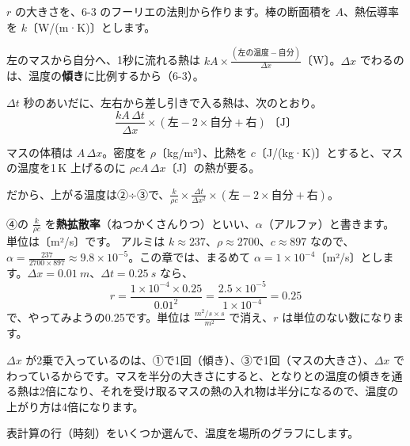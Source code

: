 $r$ の大きさを、6-3 のフーリエの法則から作ります。棒の断面積を $A$、熱伝導率を $k$〔W/(m·K)〕とします。
\begin{enumerate}[label={\bkcircled[\bkTT]{\arabic*}}, leftmargin=2.4\zw, itemsep=2pt, topsep=2pt]
\item 左のマスから自分へ、1秒に流れる熱は $kA\times\tfrac{(\text{左の温度}-\text{自分})}{\Delta x}$〔W〕。$\Delta x$ でわるのは、温度の\textbf{傾き}に比例するから（6-3）。
\item $\Delta t$ 秒のあいだに、左右から差し引きで入る熱は、次のとおり。
\[ \frac{kA\,\Delta t}{\Delta x}\times(\text{左}-2\times\text{自分}+\text{右})\ \text{〔J〕} \]
\item マスの体積は $A\,\Delta x$。密度を $\rho$〔kg/m³〕、比熱を $c$〔J/(kg·K)〕とすると、マスの温度を1\,K 上げるのに $\rho c A\,\Delta x$〔J〕の熱が要る。
\item だから、上がる温度は②÷③で、$\tfrac{k}{\rho c}\times\tfrac{\Delta t}{\Delta x^2}\times(\text{左}-2\times\text{自分}+\text{右})$。
\end{enumerate}
④の $\tfrac{k}{\rho c}$ を\textbf{熱拡散率}（ねつかくさんりつ）といい、$\alpha$（アルファ）と書きます。単位は〔m²/s〕です。
アルミは $k\approx237$、$\rho\approx2700$、$c\approx897$ なので、$\alpha=\tfrac{237}{2700\times897}\approx9.8\times10^{-5}$。この章では、まるめて $\alpha=1\times10^{-4}$〔m²/s〕とします。$\Delta x=\qty{0.01}{m}$、$\Delta t=\qty{0.25}{s}$ なら、
\[ r=\frac{1\times10^{-4}\times0.25}{0.01^2}=\frac{2.5\times10^{-5}}{1\times10^{-4}}=0.25 \]
で、やってみようの0.25です。単位は $\tfrac{\unit{m^2/s}\times\unit{s}}{\unit{m^2}}$ で消え、$r$ は単位のない数になります。

$\Delta x$ が2乗で入っているのは、①で1回（傾き）、③で1回（マスの大きさ）、$\Delta x$ でわっているからです。マスを半分の大きさにすると、となりとの温度の傾きを通る熱は2倍になり、それを受け取るマスの熱の入れ物は半分になるので、温度の上がり方は4倍になります。


\label{bk:8-13:graph}表計算の行（時刻）をいくつか選んで、温度を場所のグラフにします。

